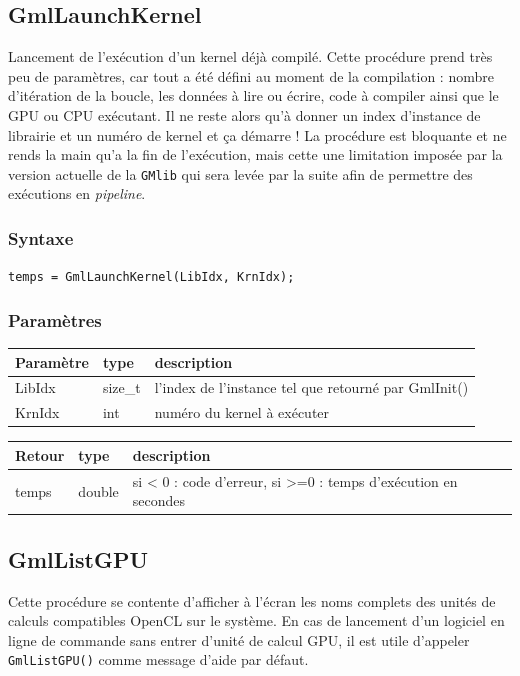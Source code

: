 \documentclass[a4paper,12pt]{article}
\begin{document}
\subsection{GmlLaunchKernel}

Lancement de l'exécution d'un kernel déjà compilé.
Cette procédure prend très peu de paramètres, car tout a été défini au moment de la compilation : nombre d'itération de la boucle, les données à lire ou écrire, code à compiler ainsi que le GPU ou CPU exécutant.
Il ne reste alors qu'à donner un index d'instance de librairie et un numéro de kernel et ça démarre !
La procédure est bloquante et ne rends la main qu'a la fin de l'exécution, mais cette une limitation imposée par la version actuelle de la {\tt GMlib} qui sera levée par la suite afin de permettre des exécutions en \emph{pipeline}.

\subsubsection*{Syntaxe}

{\tt temps = GmlLaunchKernel(LibIdx, KrnIdx);}

\subsubsection*{Paramètres}

\begin{tabular}{|m{2cm}|m{1.5cm}|m{10.5cm}|}
\hline
Paramètre  & type    & description \\
\hline
LibIdx     & size\_t & l'index de l'instance tel que retourné par GmlInit() \\
\hline
KrnIdx     & int     & numéro du kernel à exécuter \\
\hline
\end{tabular}

\medskip

\begin{tabular}{|m{2cm}|m{1.5cm}|m{10.5cm}|}
\hline
Retour     & type   & description \\
\hline
temps      & double & si < 0 : code d'erreur, si >=0 : temps d'exécution en secondes \\
\hline
\end{tabular}


\subsection{GmlListGPU}

Cette procédure se contente d'afficher à l'écran les noms complets des unités de calculs compatibles OpenCL sur le système.
En cas de lancement d'un logiciel en ligne de commande sans entrer d'unité de calcul GPU, il est utile d'appeler {\tt GmlListGPU()} comme message d'aide par défaut.
\end{document}
